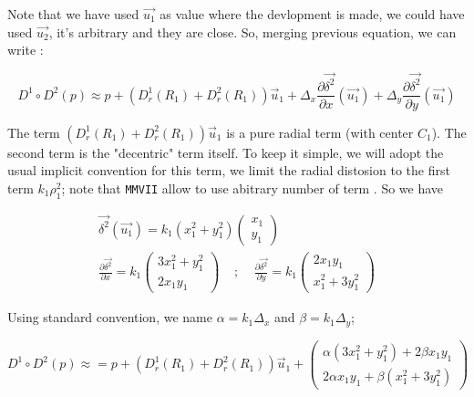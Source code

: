 Note that we have used $\vec{u_1}$ as value where the devlopment is made, we could have used $\vec{u_2}$,
it's arbitrary and they are close.
So, merging previous equation, we can write :

\begin{equation}
	D^1 \circ D^2 (p) 
	\approx
	  p +    (D^1_r(R_1) + D^2_r(R_1))  \vec{u}_1  
	  +  \Delta_x \frac{\partial{\vec{\delta^2}}}{\partial x} (\vec{u_1})
          +  \Delta_y \frac{\partial{\vec{\delta^2}}}{\partial y}  (\vec{u_1})
\end{equation}

The term $(D^1_r(R_1) + D^2_r(R_1))  \vec{u}_1 $ is a pure radial term 
(with center $C_1$).    The second term is the "decentric" term itself.
To keep it simple, we will adopt the usual implicit convention for this term,
we limit the radial distosion to the first term $k_1 \rho_1^2$; note that {\tt MMVII} allow to use 
abitrary number of term .  So we have

\begin{equation}
\begin{multlined}
	\vec{\delta^2} (\vec{u_1}) = k_1(x_1^2+y_1^2)  \begin{pmatrix} x_1  \\ y_1 \end{pmatrix} \\
%
		\frac{\partial{\vec{\delta^2}}}{\partial x} 
		=  k_1 \begin{pmatrix} 3 x_1^2 + y_1^2    \\ 2 x_1 y_1  \end{pmatrix}
%
			\;\;\;\;   ; \;\;\;\;   
		\frac{\partial{\vec{\delta^2}}}{\partial y} 
		=  k_1 \begin{pmatrix} 2 x_1 y_1 \\ x_1^2 + 3 y_1^2  \end{pmatrix}
\end{multlined}
\end{equation}


Using standard convention, we name $\alpha = k_1  \Delta_x $ and $\beta = k_1  \Delta_y$;

\begin{equation}
	D^1 \circ D^2 (p) 
	\approx
	= p +    (D^1_r(R_1) + D^2_r(R_1))  \vec{u}_1  
	  +\begin{pmatrix} \alpha(3 x_1^2 + y_1^2 ) +2\beta x_1 y_1   \\ 2  \alpha x_1 y_1 +  \beta( x_1^2 + 3 y_1^2)  \end{pmatrix}
\end{equation}

